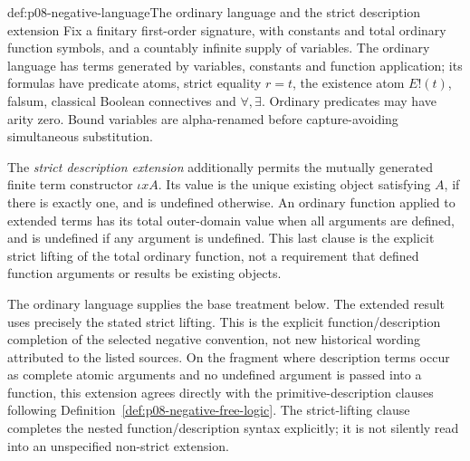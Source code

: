 \begin{hbdefinition}{def:p08-negative-language}{The ordinary language and the strict description extension}
Fix a finitary first-order signature, with constants and total ordinary
function symbols, and a countably infinite supply of variables.  The
ordinary language has terms generated by variables, constants and function
application; its formulas have predicate atoms, strict equality \(r=t\),
the existence atom \(E!(t)\), falsum, classical Boolean connectives and
\(\forall,\exists\).  Ordinary predicates may have arity zero.  Bound
variables are alpha-renamed before capture-avoiding simultaneous
substitution.

The \emph{strict description extension} additionally permits the mutually
generated finite term constructor \(\iota xA\).  Its value is the unique
existing object satisfying \(A\), if there is exactly one, and is undefined
otherwise.  An ordinary function applied to extended terms has its total
outer-domain value when all arguments are defined, and is undefined if any
argument is undefined.  This last clause is the explicit strict lifting of
the total ordinary function, not a requirement that defined function
arguments or results be existing objects.

The ordinary language supplies the base treatment below.  The
extended result uses precisely the stated strict lifting.  This is the
explicit function/description completion of the selected negative
convention, not new historical wording attributed to the listed sources.
On the fragment
where description terms occur as complete atomic arguments and no
undefined argument is passed into a function, this extension agrees directly
with the primitive-description clauses following
Definition~\ref{def:p08-negative-free-logic}.  The strict-lifting clause
completes the nested function/description syntax explicitly; it is not
silently read into an unspecified non-strict extension.
\end{hbdefinition}

